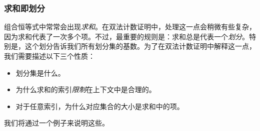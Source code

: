 \subsubsection*{求和即划分}

组合恒等式中常常会出现\emph{求和}。在双法计数证明中，处理这一点会稍微有些复杂，因为求和代表了一次多个项。不过，最重要的规则是：求和总是代表一个\emph{划分}。特别是，这个划分告诉我们所有划分集的基数。为了在双法计数证明中解释这一点，我们需要描述以下三个性质：
\begin{itemize}
    \item 划分集是什么。
    \item 为什么求和的索引\emph{限制}在上下文中是合理的。
    \item 对于任意索引，为什么对应集合的大小是求和中的项。
\end{itemize}
我们将通过一个例子来说明这些。\\

